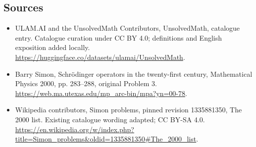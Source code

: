 \documentclass[11pt]{article}
\begin{document}
\subsection{Sources}
\begin{itemize}
\item[\hypertarget{source:statement:1}{S1}] ULAM.AI and the UnsolvedMath Contributors, UnsolvedMath, catalogue entry. Catalogue curation under CC BY 4.0; definitions and English exposition added locally.
\url{https://huggingface.co/datasets/ulamai/UnsolvedMath}.
\item[\hypertarget{source:statement:2}{S2}] Barry Simon, Schrödinger operators in the twenty-first century, Mathematical Physics 2000, pp. 283–288, original Problem 3.
\url{https://web.ma.utexas.edu/mp_arc-bin/mpa?yn=00-78}.
\item[\hypertarget{source:statement:3}{S3}] Wikipedia contributors, Simon problems, pinned revision 1335881350, The 2000 list. Existing catalogue wording adapted; CC BY-SA 4.0.
\url{https://en.wikipedia.org/w/index.php?title=Simon_problems&oldid=1335881350#The_2000_list}.
\end{itemize}
\label{end:statement}
\end{document}
